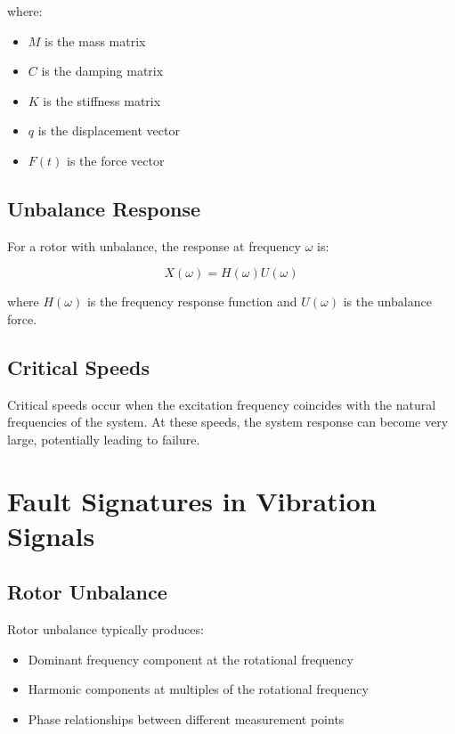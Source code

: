 where:
\begin{itemize}
    \item $M$ is the mass matrix
    \item $C$ is the damping matrix
    \item $K$ is the stiffness matrix
    \item $q$ is the displacement vector
    \item $F(t)$ is the force vector
\end{itemize}

\subsection{Unbalance Response}

For a rotor with unbalance, the response at frequency $\omega$ is:

\begin{equation}
X(\omega) = H(\omega)U(\omega)
\end{equation}

where $H(\omega)$ is the frequency response function and $U(\omega)$ is the unbalance force.

\subsection{Critical Speeds}

Critical speeds occur when the excitation frequency coincides with the natural frequencies of the system. At these speeds, the system response can become very large, potentially leading to failure.

\section{Fault Signatures in Vibration Signals}

\subsection{Rotor Unbalance}

Rotor unbalance typically produces:

\begin{itemize}
    \item Dominant frequency component at the rotational frequency
    \item Harmonic components at multiples of the rotational frequency
    \item Phase relationships between different measurement points
\end{itemize}

